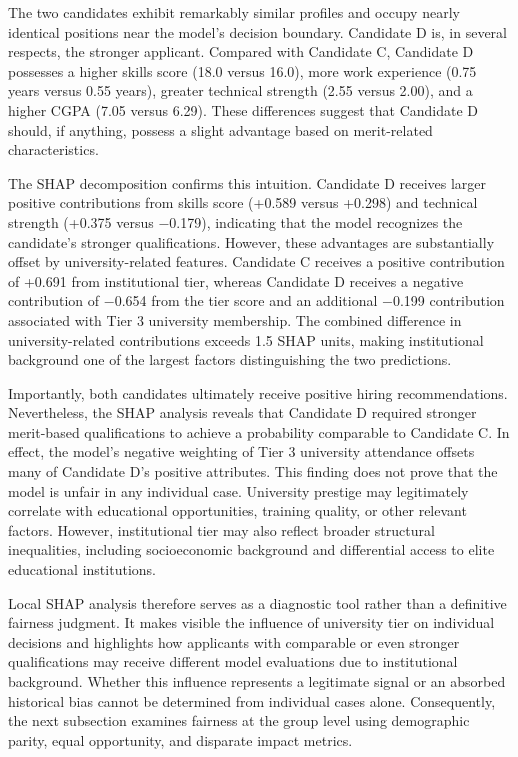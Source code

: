 \documentclass[conference]{IEEEtran}
\begin{document}
The two candidates exhibit remarkably similar profiles and occupy nearly identical positions near the model's decision boundary. Candidate D is, in several respects, the stronger applicant. Compared with Candidate C, Candidate D possesses a higher skills score (18.0 versus 16.0), more work experience (0.75 years versus 0.55 years), greater technical strength (2.55 versus 2.00), and a higher CGPA (7.05 versus 6.29). These differences suggest that Candidate D should, if anything, possess a slight advantage based on merit-related characteristics.

The SHAP decomposition confirms this intuition. Candidate D receives larger positive contributions from skills score (+0.589 versus +0.298) and technical strength (+0.375 versus $-$0.179), indicating that the model recognizes the candidate's stronger qualifications. However, these advantages are substantially offset by university-related features. Candidate C receives a positive contribution of +0.691 from institutional tier, whereas Candidate D receives a negative contribution of $-$0.654 from the tier score and an additional $-$0.199 contribution associated with Tier 3 university membership. The combined difference in university-related contributions exceeds 1.5 SHAP units, making institutional background one of the largest factors distinguishing the two predictions.

Importantly, both candidates ultimately receive positive hiring recommendations. Nevertheless, the SHAP analysis reveals that Candidate D required stronger merit-based qualifications to achieve a probability comparable to Candidate C. In effect, the model's negative weighting of Tier 3 university attendance offsets many of Candidate D's positive attributes. This finding does not prove that the model is unfair in any individual case. University prestige may legitimately correlate with educational opportunities, training quality, or other relevant factors. However, institutional tier may also reflect broader structural inequalities, including socioeconomic background and differential access to elite educational institutions.

Local SHAP analysis therefore serves as a diagnostic tool rather than a definitive fairness judgment. It makes visible the influence of university tier on individual decisions and highlights how applicants with comparable or even stronger qualifications may receive different model evaluations due to institutional background. Whether this influence represents a legitimate signal or an absorbed historical bias cannot be determined from individual cases alone. Consequently, the next subsection examines fairness at the group level using demographic parity, equal opportunity, and disparate impact metrics.
\end{document}
